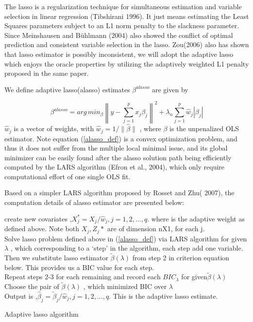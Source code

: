\documentclass[titlepage,11pt]{article}
\begin{document}
The lasso is a regularization technique for simultaneous estimation and variable selection in linear regression (Tibshirani 1996).  It just means estimating the Least Squares parameters subject to an L1 norm penalty to the slackness parameter. Since Meinshausen and Bühlmann (2004) also showed the conflict of optimal prediction and consistent variable selection in the lasso.  Zou(2006) also has shown that lasso estimator is possibly inconsistent, we will adopt the adaptive lasso which enjoys the oracle properties
by utilizing the adaptively weighted L1 penalty proposed in the same paper.

We define adaptive lasso(alasso) estimates $\beta^{alasso}$ are given by

\begin{equation}
\label{alasso_def}
\beta^{alasso}=arg\,min_{\beta} \left\| y-\sum^p_{j=1}x_j\beta_j \right\| ^2 + \lambda_n\sum^p_{j=1}\hat{w}_j|\beta_j|
\end{equation}
$\hat{w}_j$  is a vector of weights, with $\hat{w}_j = 1/\|\hat{\beta}\|$ , where $\beta$ is the unpenalized OLS estimator. Note equation (\ref{alasso_def}) is a convex optimization problem, and thus it does not suffer from the multiple  local minimal issue, and its global minimizer can be easily found after the alasso solution path being efficiently computed by the LARS algorithm (Efron et al., 2004), which only require computational effort of one single OLS fit. 

Based on a simpler LARS algorithm proposed by  Rosset and Zhu( 2007), the computation details  of alasso estimator are presented below:


\begin{algorithm}[!htbp]
	create new covariates ,$X_j^* = X_j/\hat{w}_j, j = 1,2,...,q $. where is the adaptive weight as defined above. Note both $X_j, Z_j*$ are of dimension nX1, for each j.\\
	Solve lasso problem defined above in (\ref{alasso_def}) via LARS algorithm for given $\lambda$ , which corresponding to a ‘step’ in the algorithm, each step add one variable.\\
	Then we substitute lasso estimator $\tilde{\beta}(\lambda)$ from step 2  in criterion equation below. This provides us a BIC value for each step.\\
	Repeat steps 2-3 for each remaining  and record each $BIC_\lambda$ for given$\tilde{\beta}(\lambda)$ \\
	Choose the pair of $\tilde{\beta}(\lambda)$ , which minimized BIC over $\lambda$\\
	Output is ,$\hat{\beta}_j = \tilde{\beta}_j/\hat{w}_j, j = 1,2,...,q $. This is the adaptive lasso estimate.
	\caption{Adaptive lasso algorithm}
	\label{alasso_alg}
\end{algorithm}
\end{document}
